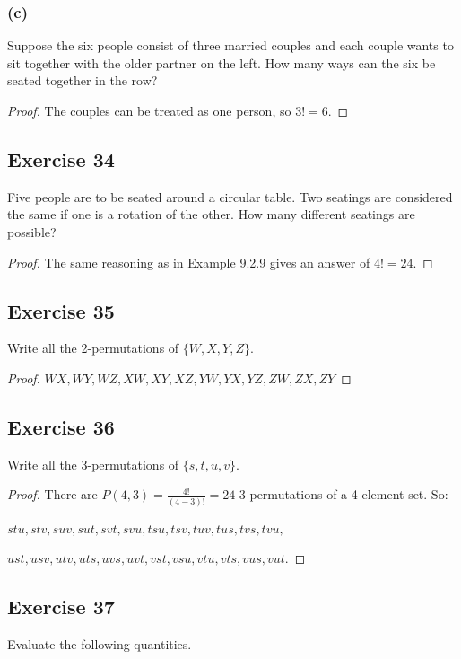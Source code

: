 \documentclass[14pt]{extarticle}
\newcommand{\dps}{\displaystyle}
\begin{document}
\subsubsection{(c)}
Suppose the six people consist of three married couples and each couple wants to sit together with the older partner on 
the left. How many ways can the six be seated together in the row?

\begin{proof}
The couples can be treated as one person, so \(3! = 6\).
\end{proof}

\subsection{Exercise 34}
Five people are to be seated around a circular table. Two seatings are considered the same if one is a rotation of 
the other. How many different seatings are possible?

\begin{proof}
The same reasoning as in Example 9.2.9 gives an answer of \(4! = 24\).
\end{proof}

\subsection{Exercise 35}
Write all the 2-permutations of \(\{W, X, Y, Z\}\).

\begin{proof}
\(WX, WY, WZ, XW, XY, XZ, YW, YX, YZ, ZW, ZX, ZY\)
\end{proof}

\subsection{Exercise 36}
Write all the 3-permutations of \(\{s, t, u, v\}\).

\begin{proof}
There are \(P(4,3) = \dps\frac{4!}{(4-3)!} = 24\) 3-permutations of a 4-element set. So:

\(stu, stv, suv, sut, svt, svu, tsu, tsv, tuv, tus, tvs, tvu,\)

\(ust, usv, utv, uts, uvs, uvt, vst, vsu, vtu, vts, vus, vut.\)
\end{proof}

\subsection{Exercise 37}
Evaluate the following quantities.
\end{document}
